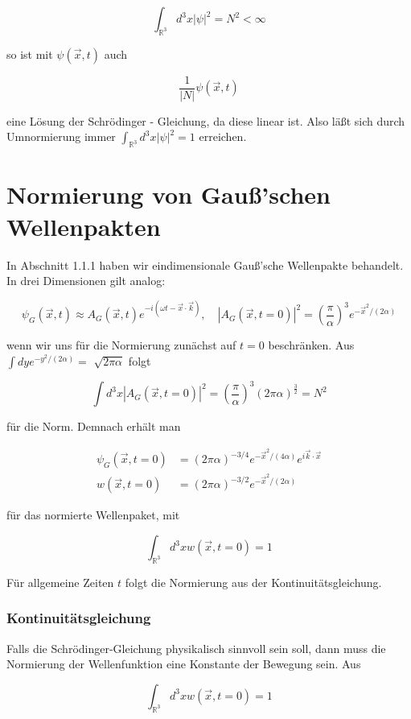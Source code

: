 \documentclass[10pt, letterpaper]{article}
\begin{document}
$$
\int_{\mathbb{R}^{3}} d^{3} x|\psi|^{2}=N^{2}<\infty
$$

so ist mit $\psi(\vec{x}, t)$ auch

$$
\frac{1}{|N|} \psi(\vec{x}, t)
$$

eine Lösung der Schrödinger - Gleichung, da diese linear ist. Also läßt sich durch Umnormierung immer $\int_{\mathbb{R}^{3}} d^{3} x|\psi|^{2}=1$ erreichen.

\section*{Normierung von Gauß'schen Wellenpakten}
In Abschnitt 1.1.1 haben wir eindimensionale Gauß'sche Wellenpakte behandelt. In drei Dimensionen gilt analog:

$$
\psi_{G}(\vec{x}, t) \approx A_{G}(\vec{x}, t) e^{-i(\omega t-\vec{x} \cdot \vec{k})}, \quad\left|A_{G}(\vec{x}, t=0)\right|^{2}=\left(\frac{\pi}{\alpha}\right)^{3} e^{-\vec{x}^{2} /(2 \alpha)}
$$

wenn wir uns für die Normierung zunächst auf $t=0$ beschränken. Aus $\int d y e^{-y^{2} /(2 \alpha)}=$ $\sqrt{2 \pi \alpha}$ folgt

$$
\int d^{3} x\left|A_{G}(\vec{x}, t=0)\right|^{2}=\left(\frac{\pi}{\alpha}\right)^{3}(2 \pi \alpha)^{\frac{3}{2}}=N^{2}
$$

für die Norm. Demnach erhält man

$$
\begin{aligned}
\psi_{G}(\vec{x}, t=0) & =(2 \pi \alpha)^{-3 / 4} e^{-\vec{x}^{2} /(4 \alpha)} e^{i \vec{k} \cdot \vec{x}} \\
w(\vec{x}, t=0) & =(2 \pi \alpha)^{-3 / 2} e^{-\vec{x}^{2} /(2 \alpha)}
\end{aligned}
$$

für das normierte Wellenpaket, mit

$$
\int_{\mathbb{R}^{3}} d^{3} x w(\vec{x}, t=0)=1
$$

Für allgemeine Zeiten $t$ folgt die Normierung aus der Kontinuitätsgleichung.

\subsubsection*{Kontinuitätsgleichung}
Falls die Schrödinger-Gleichung physikalisch sinnvoll sein soll, dann muss die Normierung der Wellenfunktion eine Konstante der Bewegung sein. Aus

$$
\int_{\mathbb{R}^{3}} d^{3} x w(\vec{x}, t=0)=1
$$
\end{document}
